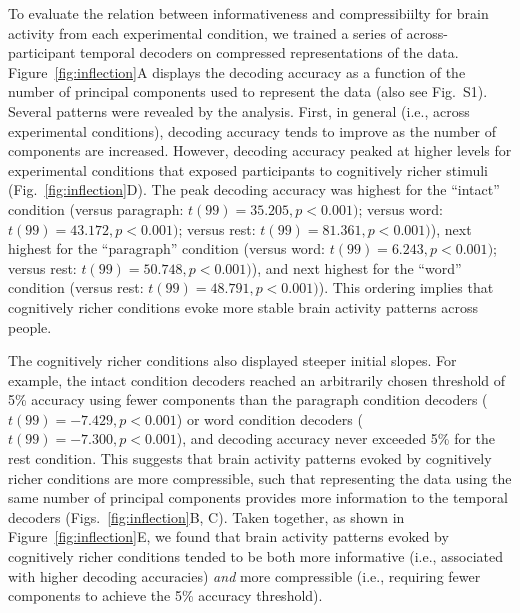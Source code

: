 \documentclass[english, 11pt]{article}
\newcommand{\varExplained}{S1}
\begin{document}
To evaluate the relation between informativeness and compressibiilty for brain
activity from each experimental condition, we trained a series of
across-participant temporal decoders on compressed representations of the data.
Figure~\ref{fig:inflection}A displays the decoding accuracy as a function of
the number of principal components used to represent the data (also see
Fig.~\varExplained). Several patterns were revealed by the analysis. First, in
general (i.e., across experimental conditions), decoding accuracy tends to
improve as the number of components are increased. However, decoding accuracy
peaked at higher levels for experimental conditions that exposed participants
to cognitively richer stimuli (Fig.~\ref{fig:inflection}D). The peak decoding
accuracy was highest for the ``intact'' condition (versus paragraph: $t(99) =
35.205, p < 0.001)$; versus word: $t(99) = 43.172, p < 0.001)$; versus rest:
$t(99) = 81.361, p < 0.001)$), next highest for the ``paragraph'' condition
(versus word: $t(99) = 6.243, p < 0.001)$; versus rest: $t(99) = 50.748, p <
0.001)$), and next highest for the ``word'' condition (versus rest: $t(99) =
48.791, p < 0.001)$). This ordering implies that cognitively richer conditions
evoke more stable brain activity patterns across people.

The cognitively richer conditions also displayed steeper initial slopes. For
example, the intact condition decoders reached an arbitrarily chosen threshold
of 5\% accuracy using fewer components than the paragraph condition decoders
($t(99) = -7.429, p < 0.001$) or word condition decoders ($t(99) = -7.300, p <
0.001$), and decoding accuracy never exceeded 5\% for the rest condition. This
suggests that brain activity patterns evoked by cognitively richer conditions
are more compressible, such that representing the data using the same number of
principal components provides more information to the temporal decoders
(Figs.~\ref{fig:inflection}B, C). Taken together, as shown in
Figure~\ref{fig:inflection}E, we found that brain activity patterns evoked by
cognitively richer conditions tended to be both more informative (i.e.,
associated with higher decoding accuracies) \textit{and} more compressible
(i.e., requiring fewer components to achieve the 5\% accuracy threshold).
\end{document}
